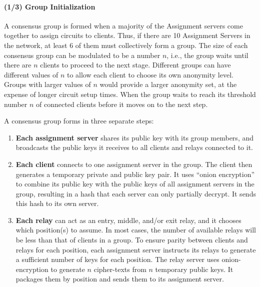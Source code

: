 \paragraph{(1/3) Group Initialization}

A consensus group is formed when a majority of the Assignment servers come
together to assign circuits to clients. Thus, if there are 10 Assignment
Servers in the network, at least 6 of them must collectively form a group. The
size of each consensus group can be modulated to be a number $n$, i.e., the
group waits until there are $n$ clients to proceed to the next stage. Different
groups can have different values of $n$ to allow each client to choose its own
anonymity level. Groups with larger values of $n$ would provide a larger
anonymity set, at the expense of longer circuit setup times. When the group
waits to reach its threshold number $n$ of connected clients before it moves
on to the next step.



A consensus group forms in three separate steps:

\begin{enumerate} 

\item \textbf{Each assignment server} shares its public key with its group
members, and broadcasts the public keys it receives to all clients and relays
connected to it.

\item \textbf{Each client} connects to one assignment server in the group. The
client then generates a temporary private and public key pair. It uses ``onion
encryption'' to combine its public key with the public keys of all assignment
servers in the group, resulting in a hash that each server can only partially
decrypt. It sends this hash to its own server.

\item \textbf{Each relay} can act as an entry, middle, and/or exit relay, and
it chooses which position(s) to assume. In most cases, the number of available
relays will be less than that of clients in a group. To ensure parity between
clients and relays for each position, each assignment server instructs its relays to generate a
sufficient number of keys for each position. The relay server uses
onion-encryption to generate $n$ cipher-texts from $n$ temporary public keys.
It packages them by position and sends them to its assignment server.
\end{enumerate}

